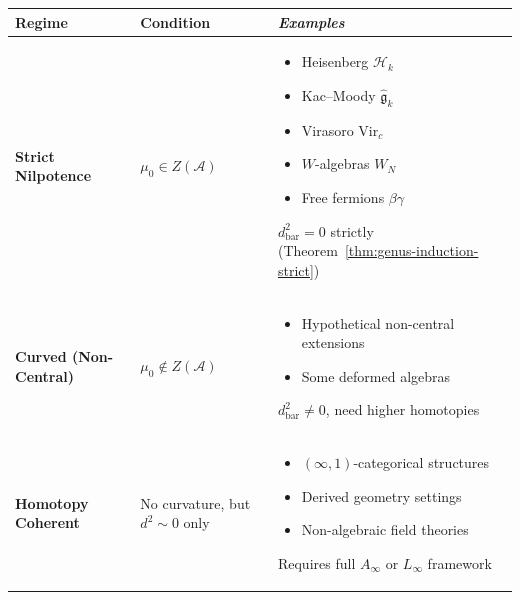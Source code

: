 \begin{center}
\begin{tabular}{|>{\raggedright\arraybackslash}p{3.5cm}|>{\raggedright\arraybackslash}p{4cm}|>{\raggedright\arraybackslash}p{6cm}|}
\hline
\textbf{Regime} & \textbf{Condition} & \emph{Examples} \\
\hline
\hline
\textbf{Strict Nilpotence} & $\mu_0 \in Z(\mathcal{A})$ & 
\begin{itemize}[leftmargin=*]
\item Heisenberg $\mathcal{H}_k$
\item Kac--Moody $\widehat{\mathfrak{g}}_k$
\item Virasoro $\text{Vir}_c$
\item $W$-algebras $W_N$
\item Free fermions $\beta\gamma$
\end{itemize}
$d_{\text{bar}}^2 = 0$ strictly (Theorem~\ref{thm:genus-induction-strict}) \\
\hline
\textbf{Curved (Non-Central)} & $\mu_0 \notin Z(\mathcal{A})$ & 
\begin{itemize}[leftmargin=*]
\item Hypothetical non-central extensions
\item Some deformed algebras
\end{itemize}
$d_{\text{bar}}^2 \neq 0$, need higher homotopies \\
\hline
\textbf{Homotopy Coherent} & No curvature, but $d^2 \sim 0$ only & 
\begin{itemize}[leftmargin=*]
\item $(\infty,1)$-categorical structures
\item Derived geometry settings
\item Non-algebraic field theories
\end{itemize}
Requires full $A_\infty$ or $L_\infty$ framework \\
\hline
\end{tabular}
\end{center}

